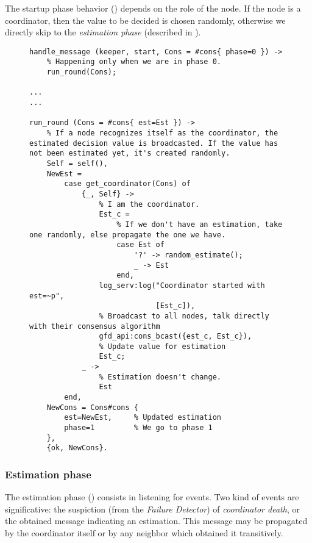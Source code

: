 The startup phase behavior () depends on the
role of the node. If the node is a coordinator, then the value to be
decided is chosen randomly, otherwise we directly skip to the
\emph{estimation phase} (described in ).

\begin{figure}[hbt]
\begin{lstlisting}[caption={Startup phase},
                   label={code:ConsStartup}]
handle_message (keeper, start, Cons = #cons{ phase=0 }) ->
    % Happening only when we are in phase 0.
    run_round(Cons);

...
...

run_round (Cons = #cons{ est=Est }) ->
    % If a node recognizes itself as the coordinator, the estimated decision value is broadcasted. If the value has not been estimated yet, it's created randomly.
    Self = self(),
    NewEst =
        case get_coordinator(Cons) of
            {_, Self} ->
                % I am the coordinator.
                Est_c =
                    % If we don't have an estimation, take one randomly, else propagate the one we have.
                    case Est of
                        '?' -> random_estimate();
                        _ -> Est
                    end,
                log_serv:log("Coordinator started with est=~p",
                             [Est_c]),
                % Broadcast to all nodes, talk directly with their consensus algorithm
                gfd_api:cons_bcast({est_c, Est_c}),
                % Update value for estimation
                Est_c;
            _ ->
                % Estimation doesn't change.
                Est
        end,
    NewCons = Cons#cons {
        est=NewEst,     % Updated estimation
        phase=1         % We go to phase 1
    },
    {ok, NewCons}.
\end{lstlisting}
\end{figure}

\subsubsection{Estimation phase} \label{subsub:ConsEstimation}

The estimation phase () consists in listening
for events. Two kind of events are significative: the suspiction (from the
\emph{Failure Detector}) of \emph{coordinator death}, or the obtained
message indicating an estimation. This message may be propagated by the
coordinator itself or by any neighbor which obtained it transitively.

